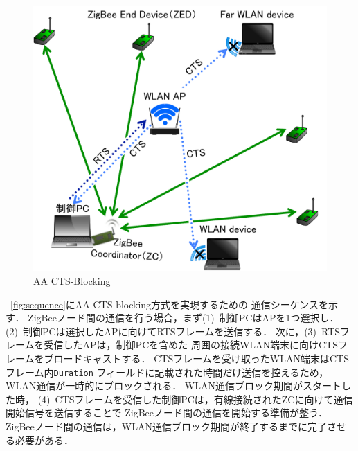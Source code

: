 \documentclass[technicalreport]{ieicej}
\begin{document}
\begin{figure}[bt]
 \centering
 \includegraphics[width=\columnwidth]{figure/aa_cts_blocking.pdf}
 \caption{AA CTS-Blocking}
 \label{fig:aa_cts_blocking}
\end{figure}

\figurename~\ref{fig:sequence}にAA CTS-blocking方式を実現するための
通信シーケンスを示す．
ZigBeeノード間の通信を行う場合，まず(1)~制御PCはAPを1つ選択し．
(2)~制御PCは選択したAPに向けてRTSフレームを送信する．
次に，(3)~RTSフレームを受信したAPは，制御PCを含めた
周囲の接続WLAN端末に向けCTSフレームをブロードキャストする．
CTSフレームを受け取ったWLAN端末はCTSフレーム内\texttt{Duration}
フィールドに記載された時間だけ送信を控えるため，WLAN通信が一時的にブロックされる．
WLAN通信ブロック期間がスタートした時，
(4)~CTSフレームを受信した制御PCは，有線接続されたZCに向けて通信開始信号を送信することで
ZigBeeノード間の通信を開始する準備が整う．
ZigBeeノード間の通信は，WLAN通信ブロック期間が終了するまでに完了させる必要がある．
\end{document}
